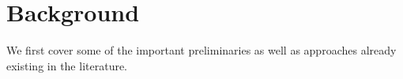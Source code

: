 \vspace{-2mm}
\section{Background}
\label{sec:background}
\vspace{-1mm}
We first cover some of the important preliminaries as well as approaches already existing in the literature. 

